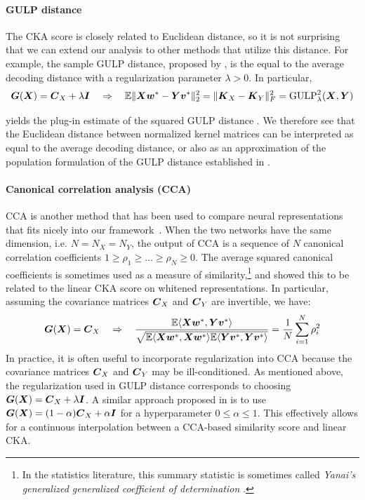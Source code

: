\paragraph{GULP distance}
The CKA score is closely related to Euclidean distance, so it is not surprising that we can extend our analysis to other methods that utilize this distance.
For example, the sample GULP distance, proposed by \cite{BoixAdsera2022}, is the equal to the average decoding distance with a regularization parameter $\lambda > 0$.
In particular,
%
\begin{align*}
\boldsymbol{G}(\boldsymbol{X}) = \boldsymbol{C}_X + \lambda \boldsymbol{I} \quad \Rightarrow \quad  \mathbb{E} \Vert \boldsymbol{X} \boldsymbol{w}^* - \boldsymbol{Y} \boldsymbol{v}^* \Vert^2_2 = \Vert \boldsymbol{K}_X - \boldsymbol{K}_Y \Vert_F^2 = \text{GULP}_\lambda^2(\boldsymbol{X}, \boldsymbol{Y})
\end{align*}

yields the plug-in estimate of the squared GULP distance \cite[section 3]{BoixAdsera2022}.
We therefore see that the Euclidean distance between normalized kernel matrices can be interpreted as equal to the average decoding distance, or also as an approximation of the population formulation of the GULP distance established in \cite{BoixAdsera2022}.  

\paragraph{Canonical correlation analysis (CCA)} 
CCA is another method that has been used to compare neural representations that
fits nicely into our framework~\cite{raghu2017svcca,williams2021generalized}.
When the two networks have the same dimension, i.e. $N = N_X = N_Y$, the output of CCA is a sequence of $N$ canonical correlation coefficients $1 \geq \rho_1 \geq \dots \geq \rho_N \geq 0$.
The average squared canonical coefficients is sometimes used as a measure of similarity,\footnote{In the statistics literature, this summary statistic is sometimes called \textit{Yanai's generalized generalized coefficient of determination} \cite{ramsay1984matrix,Yanai1974}.} and \textcite{kornblith2019} showed this to be related to the linear CKA score on whitened representations.
In particular, assuming the covariance matrices $\boldsymbol{C}_X$ and $\boldsymbol{C}_Y$ are invertible, we have:
\begin{equation}
\boldsymbol{G}(\boldsymbol{X}) = \boldsymbol{C}_X \quad \Rightarrow \quad  \frac{\mathbb{E} \langle \boldsymbol{X} \boldsymbol{w}^*, \boldsymbol{Y} \boldsymbol{v}^* \rangle}{\sqrt{\mathbb{E} \langle \boldsymbol{X} \boldsymbol{w}^*, \boldsymbol{X} \boldsymbol{w}^* \rangle \mathbb{E} \langle \boldsymbol{Y} \boldsymbol{v}^*, \boldsymbol{Y} \boldsymbol{v}^* \rangle}} = \frac{1}{N} \sum_{i=1}^N \rho_i^2
\end{equation}
In practice, it is often useful to incorporate regularization into CCA because the covariance matrices $\boldsymbol{C}_X$ and $\boldsymbol{C}_Y$ may be ill-conditioned.
As mentioned above, the regularization used in GULP distance corresponds to choosing $\boldsymbol{G}(\boldsymbol{X}) = \boldsymbol{C}_X + \lambda \boldsymbol{I}$.
A similar approach proposed in \cite{williams2021generalized} is to use $\boldsymbol{G}(\boldsymbol{X}) = (1 - \alpha) \boldsymbol{C}_X + \alpha \boldsymbol{I}$ for a hyperparameter ${0 \leq \alpha \leq 1}$.
This effectively allows for a continuous interpolation between a CCA-based similarity score and linear CKA.

